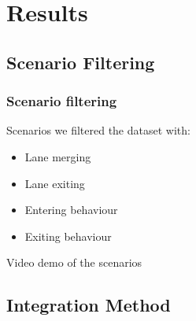 
\section{Results}

\subsection{Scenario Filtering}

\begin{frame}
  \frametitle{Scenario filtering}
    Scenarios we filtered the dataset with:
    \begin{itemize}[<+->]
      \item Lane merging
      \item Lane exiting 
      \item Entering behaviour
      \item Exiting behaviour
    \end{itemize}
\end{frame}

\begin{frame}
    \center Video demo of the scenarios
\end{frame}


\subsection{Integration Method}

